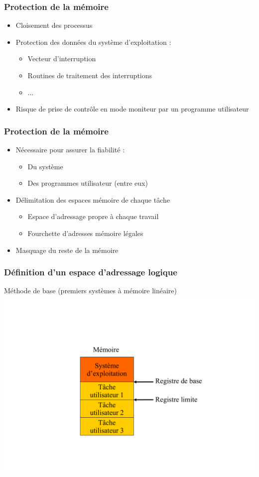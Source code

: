 \begin{frame}
  \frametitle{Protection de la mémoire}
  \begin{itemize}
\item Cloisement des processus
  \item Protection des données du système d’exploitation :
\begin{itemize}
\item Vecteur d’interruption
\item Routines de traitement des interruptions
\item ...
\end{itemize}
\item Risque de prise de contrôle en mode moniteur par un programme utilisateur
  \end{itemize}
 \end{frame}

\begin{frame}
 \frametitle{Protection de la mémoire}
 \begin{itemize}
 \item Nécessaire pour assurer la fiabilité : 
\begin{itemize}
\item Du système
\item Des programmes utilisateur (entre eux)
\end{itemize}
\item Délimitation des espaces mémoire de chaque tâche
\begin{itemize}
\item Espace d’adressage propre à chaque travail
\item Fourchette d’adresses mémoire légales
\end{itemize}
\item Masquage du reste de la mémoire
\end{itemize}
\end{frame}


\begin{frame}
 \frametitle{Définition d’un espace d’adressage logique}
 Méthode de base (premiers systèmes à mémoire linéaire)
 \includegraphics[width=.6\textwidth]{../illustration/protect_memoire_base.pdf}
\end{frame}


